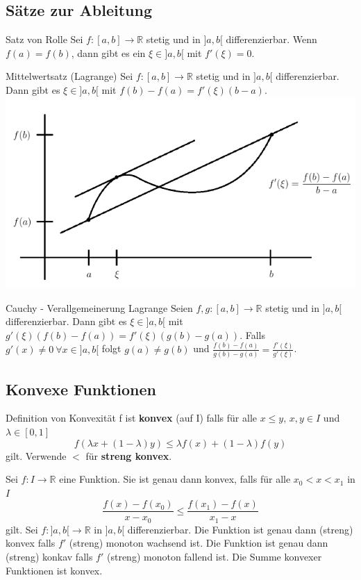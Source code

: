 \documentclass[a4paper,10pt]{article}
\def\R{\mathbb{R}}
\begin{document}
\subsection{Sätze zur Ableitung}
\begin{subbox}{Satz von Rolle}
 Sei $f: [a,b] \to \R$ stetig und in $]a,b[$ differenzierbar. Wenn $f(a) = f(b)$, dann gibt es ein $\xi \in ]a,b[$ mit $f'(\xi) = 0$.
\end{subbox}
\begin{mainbox}{Mittelwertsatz (Lagrange)}
 Sei $f: [a,b] \to \R$ stetig und in $]a,b[$ differenzierbar. Dann gibt es $\xi \in ]a,b[$ mit $f(b) - f(a) = f'(\xi)(b-a)$.
 \includegraphics[width=\linewidth]{mittelwertsatz.png}
\end{mainbox}

\begin{subbox}{Cauchy - Verallgemeinerung Lagrange}
  Seien $f, g: [a, b] \to \mathbb{R}$ stetig und in $]a, b[$ differenzierbar. Dann gibt es $\xi \in ]a, b[$ mit $g'(\xi)(f(b) - f(a)) = f'(\xi)(g(b) - g(a))$. Falls $g'(x) \neq 0 \ \forall x \in ]a, b[$ folgt $g(a) \neq g(b)$ und $\frac{f(b)-f(a)}{g(b)-g(a)} = \frac{f'(\xi)}{g'(\xi)}$.
\end{subbox}

\subsection{Konvexe Funktionen}
\begin{mainbox}{Definition von Konvexität}
  f ist \textbf{konvex} (auf I) falls für alle $x \leq y,\, x,y\in I$ und $\lambda \in [0,1]$ \[f(\lambda x + (1-\lambda)y) \leq \lambda f(x) + (1-\lambda)f(y)\] gilt. Verwende $<$ für \textbf{streng konvex}.
\end{mainbox}
Sei $f: I \to \R$ eine Funktion. Sie ist genau dann konvex, falls für alle $x_0 < x < x_1$ in $I$ \[\frac{f(x)-f(x_0)}{x-x_0}\leq \frac{f(x_1)-f(x)}{x_1-x}\] gilt. Sei $f:]a,b[ \to \R$ in $]a,b[$ differenzierbar. Die Funktion ist genau dann (streng) konvex falls $f'$ (streng) monoton wachsend ist. Die Funktion ist genau dann (streng) konkav falls $f'$ (streng) monoton fallend ist. Die Summe konvexer Funktionen ist konvex.
\end{document}
